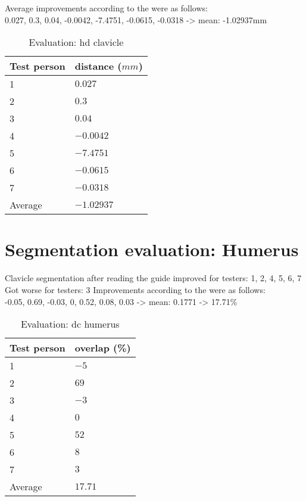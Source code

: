 \noindent
Average improvements according to the  were as follows:\\
0.027, 0.3, 0.04, -0.0042, -7.4751, -0.0615, -0.0318 -> mean: -1.02937mm
\begin{table}[ht]
	\begin{center}
		\begin{tabular}{l l}
			\textbf{Test person} & \textbf{distance ($mm$)} \\
			\hline
			1                    & $0.027$                  \\
			2                    & $0.3$                    \\
			3                    & $0.04$                   \\
			4                    & $-0.0042$                \\
			5                    & $-7.4751$                \\
			6                    & $-0.0615$                \\
			7                    & $-0.0318$                \\
			\hline
			Average              & $-1.02937$               \\
		\end{tabular}
		\caption{Evaluation: \acrshort{hd} clavicle}\label{tab:clavicle-distance}
	\end{center}
\end{table}



\section{Segmentation evaluation: Humerus}
Clavicle segmentation after reading the guide improved for testers:
1, 2, 4, 5, 6, 7
Got worse for testers:
3
Improvements according to the  were as follows:\\
-0.05, 0.69, -0.03, 0, 0.52, 0.08, 0.03 -> mean: 0.1771 -> 17.71\%\\
\begin{table}[ht]
	\begin{center}
		\begin{tabular}{l l}
			\textbf{Test person} & \textbf{overlap (\%)} \\
			\hline
			1                    & $-5$                  \\
			2                    & $69$                  \\
			3                    & $-3$                  \\
			4                    & $0$                   \\
			5                    & $52$                  \\
			6                    & $8$                   \\
			7                    & $3$                   \\
			\hline
			Average              & $17.71$               \\
		\end{tabular}
		\caption{Evaluation: \acrshort{dc} humerus}\label{tab:humerus-overlap}
	\end{center}
\end{table}

